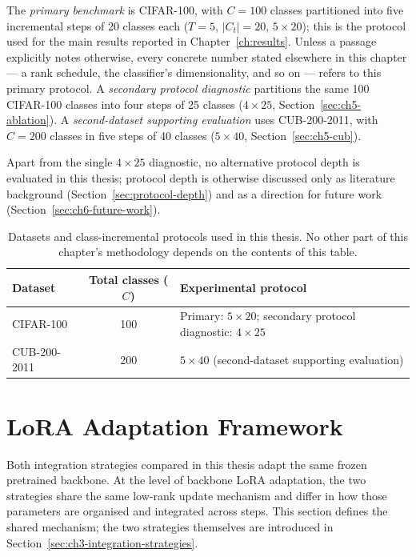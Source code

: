 The \emph{primary benchmark} is CIFAR-100, with $C=100$ classes partitioned
into five incremental steps of 20 classes each ($T=5$, $|C_t|=20$,
$5\times20$); this is the protocol used for the main results reported in
Chapter~\ref{ch:results}. Unless a passage explicitly notes otherwise,
every concrete number stated elsewhere in this chapter --- a rank schedule,
the classifier's dimensionality, and so on --- refers to this primary
protocol. A \emph{secondary protocol diagnostic} partitions the same 100
CIFAR-100 classes into four steps of 25 classes ($4\times25$,
Section~\ref{sec:ch5-ablation}). A \emph{second-dataset supporting
evaluation} uses CUB-200-2011, with $C=200$ classes in five steps of 40
classes ($5\times40$, Section~\ref{sec:ch5-cub}).

Apart from the single $4\times25$ diagnostic, no alternative protocol depth
is evaluated in this thesis; protocol depth is otherwise discussed only as
literature background (Section~\ref{sec:protocol-depth}) and as a
direction for future work (Section~\ref{sec:ch6-future-work}).

\begin{table}[htbp]
\centering
\begin{tabularx}{\textwidth}{@{}l c X@{}}
\toprule
\textbf{Dataset} & \textbf{Total classes ($C$)} & \textbf{Experimental protocol} \\
\midrule
CIFAR-100 & 100 & Primary: $5\times20$; secondary protocol diagnostic: $4\times25$ \\
CUB-200-2011 & 200 & $5\times40$ (second-dataset supporting evaluation) \\
\bottomrule
\end{tabularx}
\caption[Dataset and protocol configuration]{Datasets and class-incremental
protocols used in this thesis. No other part of this chapter's methodology
depends on the contents of this table.}
\label{tab:ch3-protocol-config}
\end{table}

\section{LoRA Adaptation Framework}
\label{sec:ch3-lora-framework}

Both integration strategies compared in this thesis adapt the same frozen
pretrained backbone. At the level of backbone LoRA adaptation, the two
strategies share the same low-rank update mechanism and differ in how those
parameters are organised and integrated across steps. This section defines the shared
mechanism; the two strategies themselves are introduced in Section~\ref{sec:ch3-integration-strategies}.

